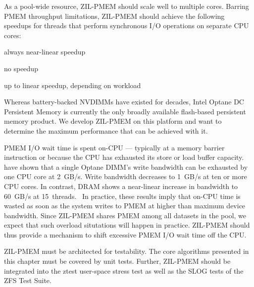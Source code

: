 \documentclass[12pt,a4paper,twoside,draft]{book}
\begin{document}
As a pool-wide resource, ZIL-PMEM should scale well to multiple cores.
Barring PMEM throughput limitations, ZIL-PMEM should achieve the following speedups for threads that perform synchronous I/O operations on separate CPU cores:
{
\setlength{\parskip}{0pt}
\begin{description}[topsep=0pt, noitemsep, leftmargin=1cm, labelindent=1cm, widest=1 private dataset per thread]
    \item[1 private dataset per thread] always near-linear speedup
    \item[1 shared dataset] \mbox{}
        \begin{description}[noitemsep, leftmargin=1cm, labelindent=1cm, widest=ZPL file system]
            \item[ZPL file system] no speedup
            \item[ZVOL] up to linear speedup, depending on workload
        \end{description}
\end{description}
}

Whereas battery-backed NVDIMMs have existed for decades, Intel Optane DC Persistent Memory is currently the only broadly available flash-based persistent memory product.
We develop ZIL-PMEM on this platform and want to determine the maximum performance that can be achieved with it.

PMEM I/O wait time is spent on-CPU --- typically at a memory barrier instruction or because the CPU has exhausted its store or load buffer capacity.
\citeauthor{yang_empirical_2020} have shown that a single Optane DIMM's write bandwidth can be exhausted by one CPU core at \SI{2}{GB/s}.
Write bandwidth decreases to \SI{1}{GB/s} at ten or more CPU cores.
In contrast, DRAM shows a near-linear increase in bandwidth to \SI{60}{GB/s} at \SI{15}{threads}.~\cite[fig.4]{yang_empirical_2020}
In practice, these results imply that on-CPU time is wasted as soon as the system writes to PMEM at higher than maximum device bandwidth.
Since ZIL-PMEM shares PMEM among all datasets in the pool, we expect that such overload situtations will happen in practice.
ZIL-PMEM should thus provide a mechanism to shift excessive PMEM I/O wait time off the CPU.

ZIL-PMEM must be architected for testability.
The core algorithms presented in this chapter must be covered by unit tests.
Further, ZIL-PMEM should be integrated into the ztest user-space stress test as well as the SLOG tests of the ZFS Test Suite.
\end{document}
